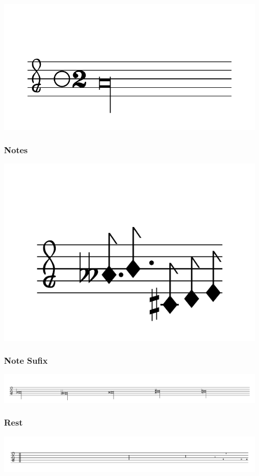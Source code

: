 \documentclass{article}
\begin{document}
        \includegraphics[scale=0.5]{figures_tests/pdf/smens/perfectmeter10.pdf}

    \subsubsection{Notes}
        \includegraphics[scale=0.5]{figures_tests/pdf/smens/note1.pdf}

    \subsubsection{Note Sufix}
        \includegraphics[scale=0.28]{figures_tests/pdf/smens/notesufix.pdf}

    \subsubsection{Rest}
        \includegraphics[scale=0.3]{figures_tests/pdf/smens/rest1.pdf}
\end{document}
